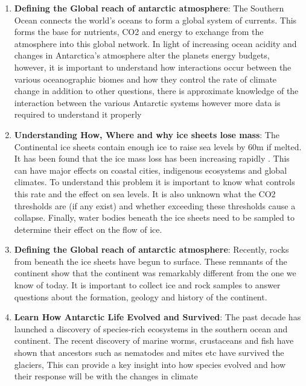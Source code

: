 \begin{enumerate}
    \item \textbf{Defining the Global reach of antarctic atmosphere}: 
    \newline 
    \newline
    The Southern Ocean connects the world's oceans to form a global system of currents. This forms the base for nutrients, CO2 and energy to exchange from the atmosphere into this global network. In light of increasing ocean acidity and changes in Antarctica’s atmosphere alter the planets energy budgets, however, it is important to understand how interactions occur between the various oceanographic biomes and how they control the rate of climate change in addition to other questions, there is approximate knowledge of the interaction between the various Antarctic systems however more data is required to understand it properly\
    \item \textbf{Understanding How, Where and why ice sheets lose mass}: 
    \newline 
    \newline
    The Continental ice sheets contain enough ice to raise sea levels by 60m if melted. It has been found that the ice mass loss has been increasing rapidly \cite{}. This can have major effects on coastal cities, indigenous ecosystems and global climates. To understand this problem it is important to know what controls this rate and the effect on sea levels. It is also unknown what the CO2 thresholds are (if any exist) and whether exceeding these thresholds cause a collapse. Finally, water bodies beneath the ice sheets need to be sampled to determine their effect on the flow of ice.
       \item \textbf{Defining the Global reach of antarctic atmosphere}: 
    \newline 
    \newline
    Recently, rocks from beneath the ice sheets have begun to surface. These remnants of the continent show that the continent was remarkably different from the one we know of today. It is important to collect ice and rock samples to answer questions about the formation, geology and history of the continent.
    \item \textbf{Learn How Antarctic Life Evolved and Survived}: 
    \newline 
    \newline
    The past decade has launched a discovery of species-rich ecosystems in the southern ocean and continent. The recent discovery of marine worms, crustaceans and fish have shown that ancestors such as nematodes and mites etc have survived the glaciers, This can provide a key insight into how species evolved and how their response will be with the changes in climate

\end{enumerate}
